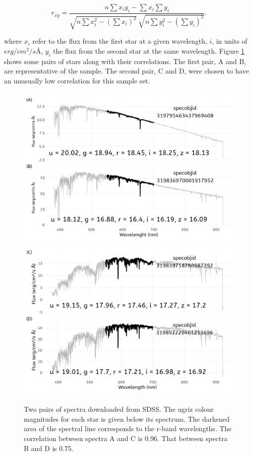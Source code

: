 \documentclass[]{elsarticle} %
\begin{document}
\begin{equation}
  \displaystyle r_{xy}={\frac {n\sum x_{i}y_{i}-\sum x_{i}\sum y_{i}}{{\sqrt {n\sum x_{i}^{2}-\left(\sum x_{i}\right)^{2}}}~{\sqrt {n\sum y_{i}^{2}-\left(\sum y_{i}\right)^{2}}}}}.
  \label{eq:correlation}
\end{equation}

where \(x_i\) refer to the flux from the first star at a given
wavelength, \(i\), in units of \(erg/cm^2/s Å\), \(y_i\) the flux from
the second star at the same wavelength. Figure \ref{fig:spectra} shows
some pairs of stars along with their correlations. The first pair, A and
B, are representative of the sample. The second pair, C and D, were
chosen to have an unusually low correlation for this sample set.

\begin{figure}
  \includegraphics[width=\columnwidth, height = 8cm]{figures/spectra1}
  \includegraphics[width=\columnwidth, height = 8cm]{figures/spectra2}
    \caption{Two pairs of spectra downloaded from SDSS. The ugriz colour magnitudes for each star is given below its spectrum. The darkened area of the spectral line corresponds to the r-band wavelengths. The correlation between spectra A and C is 0.96. That between spectra B and D is 0.75.}
    \label{fig:spectra}
\end{figure}
\end{document}
